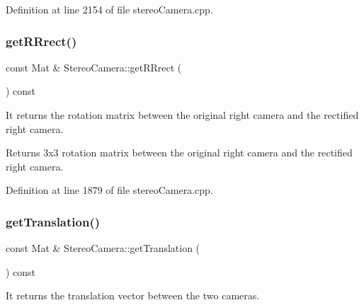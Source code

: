 Definition at line 2154 of file stereo\+Camera.\+cpp.


\begin{DoxyCode}{0}

\end{DoxyCode}
\mbox{\label{classStereoCamera_a44e111911af89a299b134fd91b4bc7d6}} 
\subsubsection{\texorpdfstring{getRRrect()}{getRRrect()}}
{\footnotesize\ttfamily const Mat \& Stereo\+Camera\+::get\+R\+Rrect (\begin{DoxyParamCaption}{ }\end{DoxyParamCaption}) const}



It returns the rotation matrix between the original right camera and the rectified right camera. 

\begin{DoxyReturn}{Returns}
3x3 rotation matrix between the original right camera and the rectified right camera. 
\end{DoxyReturn}


Definition at line 1879 of file stereo\+Camera.\+cpp.


\begin{DoxyCode}{0}

\end{DoxyCode}
\mbox{\label{classStereoCamera_a3ca6d46fc45835bff5fa0a5753ca40c0}} 
\subsubsection{\texorpdfstring{getTranslation()}{getTranslation()}}
{\footnotesize\ttfamily const Mat \& Stereo\+Camera\+::get\+Translation (\begin{DoxyParamCaption}{ }\end{DoxyParamCaption}) const}



It returns the translation vector between the two cameras. 

